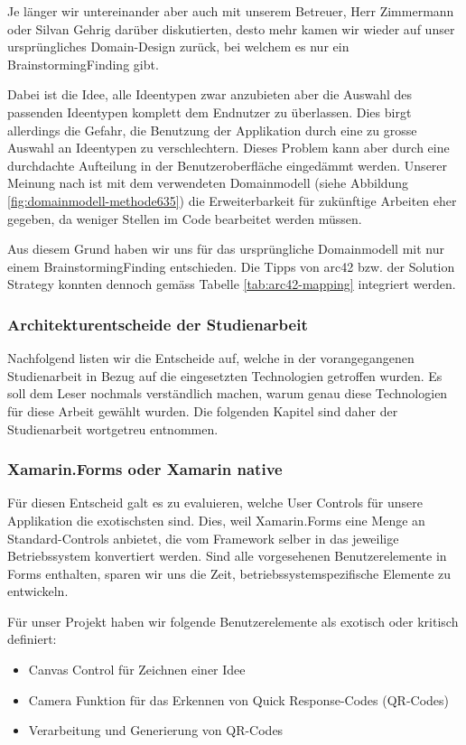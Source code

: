 Je länger wir untereinander aber auch mit unserem Betreuer, Herr Zimmermann oder Silvan Gehrig darüber diskutierten, desto mehr kamen wir wieder auf unser ursprüngliches Domain-Design zurück, bei welchem es nur ein BrainstormingFinding gibt. 

Dabei ist die Idee, alle Ideentypen zwar anzubieten aber die Auswahl des passenden Ideentypen komplett dem Endnutzer zu überlassen. Dies birgt allerdings die Gefahr, die Benutzung der Applikation durch eine zu grosse Auswahl an Ideentypen zu verschlechtern. Dieses Problem kann aber durch eine durchdachte Aufteilung in der Benutzeroberfläche eingedämmt werden. Unserer Meinung nach ist mit dem verwendeten Domainmodell (siehe Abbildung \ref{fig:domainmodell-methode635}) die Erweiterbarkeit für zukünftige Arbeiten eher gegeben, da weniger Stellen im Code bearbeitet werden müssen. 

Aus diesem Grund haben wir uns für das ursprüngliche Domainmodell mit nur einem BrainstormingFinding entschieden. Die Tipps von arc42 bzw. der Solution Strategy konnten dennoch gemäss Tabelle \ref{tab:arc42-mapping} integriert werden.

\subsubsection{Architekturentscheide der Studienarbeit}
Nachfolgend listen wir die Entscheide auf, welche in der vorangegangenen Studienarbeit in Bezug auf die eingesetzten Technologien getroffen wurden. Es soll dem Leser nochmals  verständlich machen, warum genau diese Technologien für diese Arbeit gewählt wurden.
Die folgenden Kapitel sind daher der Studienarbeit \cite{methode635-sa} wortgetreu entnommen.

\subsubsection{Xamarin.Forms oder Xamarin native}\label{subsubsec:forms-vs-native}
Für diesen Entscheid galt es zu evaluieren, welche User Controls für unsere Applikation die exotischsten sind. Dies, weil Xamarin.Forms eine Menge an Standard-Controls anbietet, die vom Framework selber in das jeweilige Betriebssystem konvertiert werden. Sind alle vorgesehenen Benutzerelemente in Forms enthalten, sparen wir uns die Zeit, betriebssystemspezifische Elemente zu entwickeln. 

Für unser Projekt haben wir folgende Benutzerelemente als exotisch oder kritisch definiert:
\begin{itemize}
	\item Canvas Control für Zeichnen einer Idee
	\item Camera Funktion für das Erkennen von Quick Response-Codes (QR-Codes)
	\item Verarbeitung und Generierung von QR-Codes
\end{itemize}

